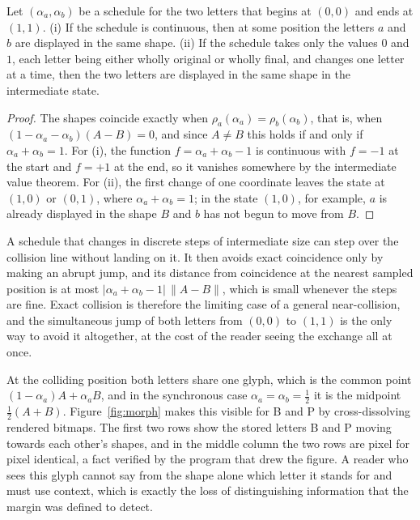\begin{proposition}\label{prop:collapse}
Let $(\alpha_a,\alpha_b)$ be a schedule for the two letters that begins at $(0,0)$ and ends at $(1,1)$. (i) If the schedule is continuous, then at some position the letters $a$ and $b$ are displayed in the same shape. (ii) If the schedule takes only the values $0$ and $1$, each letter being either wholly original or wholly final, and changes one letter at a time, then the two letters are displayed in the same shape in the intermediate state.
\end{proposition}

\begin{proof}
The shapes coincide exactly when $\rho_a(\alpha_a)=\rho_b(\alpha_b)$, that is, when $(1-\alpha_a-\alpha_b)(A-B)=0$, and since $A\ne B$ this holds if and only if $\alpha_a+\alpha_b=1$. For (i), the function $f=\alpha_a+\alpha_b-1$ is continuous with $f=-1$ at the start and $f=+1$ at the end, so it vanishes somewhere by the intermediate value theorem. For (ii), the first change of one coordinate leaves the state at $(1,0)$ or $(0,1)$, where $\alpha_a+\alpha_b=1$; in the state $(1,0)$, for example, $a$ is already displayed in the shape $B$ and $b$ has not begun to move from $B$.
\end{proof}

A schedule that changes in discrete steps of intermediate size can step over the collision line without landing on it. It then avoids exact coincidence only by making an abrupt jump, and its distance from coincidence at the nearest sampled position is at most $|\alpha_a+\alpha_b-1|\,\|A-B\|$, which is small whenever the steps are fine. Exact collision is therefore the limiting case of a general near-collision, and the simultaneous jump of both letters from $(0,0)$ to $(1,1)$ is the only way to avoid it altogether, at the cost of the reader seeing the exchange all at once.

At the colliding position both letters share one glyph, which is the common point $(1-\alpha_a)A+\alpha_aB$, and in the synchronous case $\alpha_a=\alpha_b=\tfrac12$ it is the midpoint $\tfrac12(A+B)$. Figure~\ref{fig:morph} makes this visible for B and P by cross-dissolving rendered bitmaps. The first two rows show the stored letters B and P moving towards each other's shapes, and in the middle column the two rows are pixel for pixel identical, a fact verified by the program that drew the figure. A reader who sees this glyph cannot say from the shape alone which letter it stands for and must use context, which is exactly the loss of distinguishing information that the margin was defined to detect.

